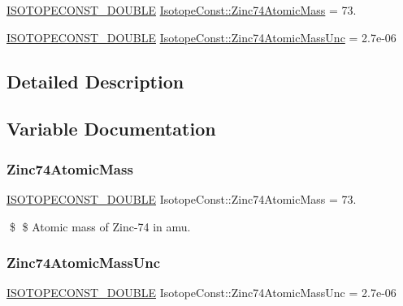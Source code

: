 \begin{DoxyCompactItemize}
\item 
\mbox{\hyperlink{group___isotope_const-_macros_ga8f45a7272ce02c0b4c65c44636ed719a}{I\+S\+O\+T\+O\+P\+E\+C\+O\+N\+S\+T\+\_\+\+D\+O\+U\+B\+LE}} \mbox{\hyperlink{group___isotope_const-_zinc-_zn74_ga29c43f628c5458272b7e2850bcfcf616}{Isotope\+Const\+::\+Zinc74\+Atomic\+Mass}} = 73.
\item 
\mbox{\hyperlink{group___isotope_const-_macros_ga8f45a7272ce02c0b4c65c44636ed719a}{I\+S\+O\+T\+O\+P\+E\+C\+O\+N\+S\+T\+\_\+\+D\+O\+U\+B\+LE}} \mbox{\hyperlink{group___isotope_const-_zinc-_zn74_ga805493ad4b930acaf4a6d30ab355a8f1}{Isotope\+Const\+::\+Zinc74\+Atomic\+Mass\+Unc}} = 2.\+7e-\/06
\end{DoxyCompactItemize}


\subsection{Detailed Description}


\subsection{Variable Documentation}
\mbox{\label{group___isotope_const-_zinc-_zn74_ga29c43f628c5458272b7e2850bcfcf616}} 
\subsubsection{\texorpdfstring{Zinc74\+Atomic\+Mass}{Zinc74AtomicMass}}
{\footnotesize\ttfamily \mbox{\hyperlink{group___isotope_const-_macros_ga8f45a7272ce02c0b4c65c44636ed719a}{I\+S\+O\+T\+O\+P\+E\+C\+O\+N\+S\+T\+\_\+\+D\+O\+U\+B\+LE}} Isotope\+Const\+::\+Zinc74\+Atomic\+Mass = 73.}

\$ \$ Atomic mass of Zinc-\/74 in amu. \mbox{\label{group___isotope_const-_zinc-_zn74_ga805493ad4b930acaf4a6d30ab355a8f1}} 
\subsubsection{\texorpdfstring{Zinc74\+Atomic\+Mass\+Unc}{Zinc74AtomicMassUnc}}
{\footnotesize\ttfamily \mbox{\hyperlink{group___isotope_const-_macros_ga8f45a7272ce02c0b4c65c44636ed719a}{I\+S\+O\+T\+O\+P\+E\+C\+O\+N\+S\+T\+\_\+\+D\+O\+U\+B\+LE}} Isotope\+Const\+::\+Zinc74\+Atomic\+Mass\+Unc = 2.\+7e-\/06}

